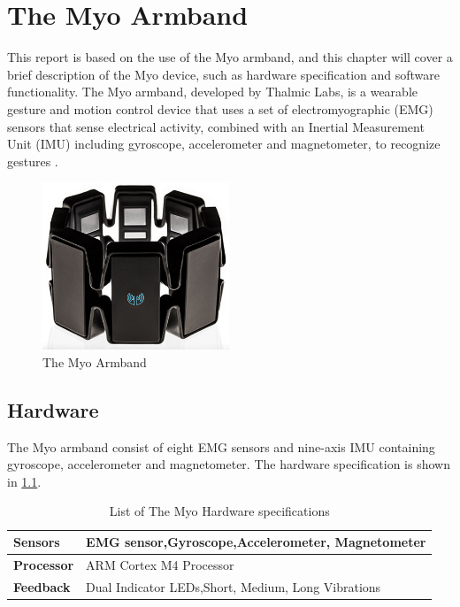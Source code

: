 \chapter{The Myo Armband}
\label{chap:myo}
This report is based on the use of the Myo armband, and this chapter will cover a brief description of the Myo device, such as hardware specification and software functionality. The Myo armband, developed by Thalmic Labs, is a wearable gesture and motion control device that uses a set of electromyographic (EMG) sensors that sense electrical activity, combined with an Inertial Measurement Unit (IMU) including gyroscope, accelerometer and magnetometer, to recognize gestures \cite{myo}.

\begin{figure}[ht]
    \centering
    \includegraphics[height=5cm]{images/myoarmband.jpg}
    \caption[The Myo Armband]{The Myo Armband}
    \label{fig:myoarmband}
\end{figure}


\section{Hardware}
The Myo armband consist of eight EMG sensors and nine-axis IMU containing gyroscope, accelerometer and magnetometer. The hardware specification is shown in \cref{table:myo_hardware}.

\begin{table}[ht!]
\centering
    \begin{tabular}{ | l | p{8cm} |}
        \hline
        \textbf{Sensors} & EMG sensor,\newline Gyroscope,\newline Accelerometer, \newline Magnetometer\\ \hline
        
        \textbf{Processor} & ARM Cortex M4 Processor  \\ \hline
        
        \textbf{Feedback} & Dual Indicator LEDs,\newline Short, Medium, Long Vibrations  \\ \hline
    \end{tabular}
    \caption[The Myo Hardware]{List of The Myo Hardware specifications}
    \label{table:myo_hardware}
\end{table}

